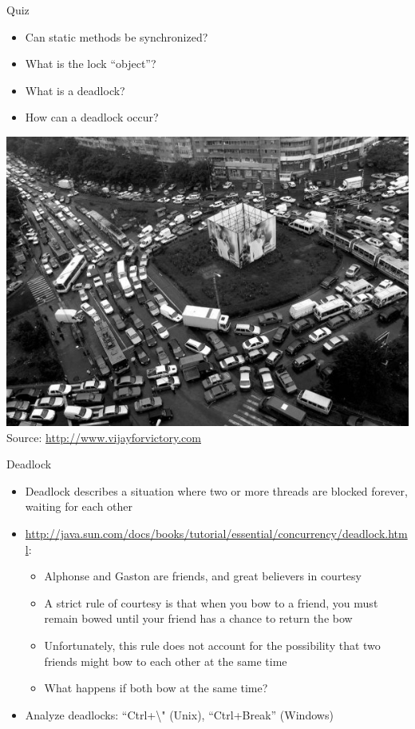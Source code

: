 \begin{frame}{Quiz}
  \begin{itemize}
  \item Can static methods be synchronized?
  \item What is the lock ``object''?
  \item What is a deadlock?
  \item How can a deadlock occur?
  \end{itemize}


  \begin{center}
    \includegraphics[scale=0.33]{figures/deadlock} \\
    \tiny{Source: \url{http://www.vijayforvictory.com}}    
  \end{center}
\end{frame}

\begin{frame}{Deadlock}
  \begin{itemize}
  \item Deadlock describes a situation where two or more threads are
    blocked forever, waiting for each other
  \item
    \url{http://java.sun.com/docs/books/tutorial/essential/concurrency/deadlock.html}:
    \begin{itemize}
    \item Alphonse and Gaston are friends, and great believers in
      courtesy
    \item A strict rule of courtesy is that when you bow to a friend,
      you must remain bowed until your friend has a chance to return
      the bow
    \item Unfortunately, this rule does not account for the
      possibility that two friends might bow to each other at the same
      time
    \item What happens if both bow at the same time?
    \end{itemize}
  \item Analyze deadlocks: ``Ctrl+\textbackslash" (Unix),
    ``Ctrl+Break'' (Windows)
  \end{itemize}
\end{frame}



